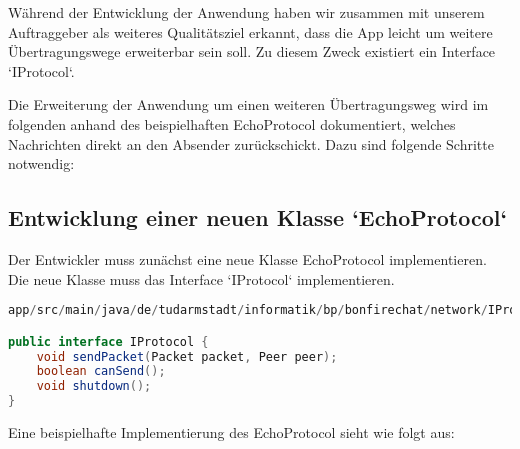 
Während der Entwicklung der Anwendung haben wir zusammen mit unserem Auftraggeber als weiteres Qualitätsziel erkannt, dass die App leicht um weitere Übertragungswege erweiterbar sein soll. Zu diesem Zweck existiert ein Interface `IProtocol`.

Die Erweiterung der Anwendung um einen weiteren Übertragungsweg wird im folgenden anhand des beispielhaften EchoProtocol dokumentiert, welches Nachrichten direkt an den Absender zurückschickt. Dazu sind folgende Schritte notwendig:

\subsection{Entwicklung einer neuen Klasse `EchoProtocol`}

Der Entwickler muss zunächst eine neue Klasse EchoProtocol implementieren. Die neue Klasse muss das Interface `IProtocol` implementieren.

\begin{lstlisting}[language=Java]
app/src/main/java/de/tudarmstadt/informatik/bp/bonfirechat/network/IProcol.java

public interface IProtocol {
    void sendPacket(Packet packet, Peer peer);
    boolean canSend();
    void shutdown();
}
\end{lstlisting}

Eine beispielhafte Implementierung des EchoProtocol sieht wie folgt aus:

